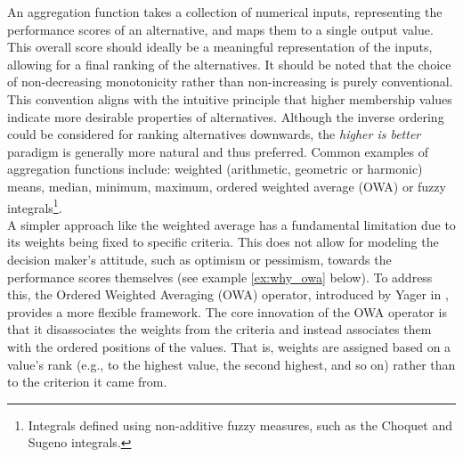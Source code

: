An aggregation function takes a collection of numerical inputs, representing the performance scores of an alternative, and maps them to a single output value. This overall score should ideally be a meaningful representation of the inputs, allowing for a final ranking of the alternatives. It should be noted that the choice of non-decreasing monotonicity rather than non-increasing is purely conventional. This convention aligns with the intuitive principle that higher membership values indicate more desirable properties of alternatives. Although the inverse ordering could be considered for ranking alternatives downwards, the \textit{higher is better} paradigm is generally more natural and thus preferred. Common examples of aggregation functions include: weighted (arithmetic, geometric or harmonic) means, median, minimum, maximum, ordered weighted average (OWA) or fuzzy integrals\footnote{Integrals defined using non-additive fuzzy measures, such as the Choquet and Sugeno integrals.}.\\

A simpler approach like the weighted average has a fundamental limitation due to its weights being fixed to specific criteria. This does not allow for modeling the decision maker's attitude, such as optimism or pessimism, towards the performance scores themselves (see example \ref{ex:why_owa} below). To address this, the Ordered Weighted Averaging (OWA) operator, introduced by Yager in \cite{YagerOWA}, provides a more flexible framework. The core innovation of the OWA operator is that it disassociates the weights from the criteria and instead associates them with the ordered positions of the values. That is, weights are assigned based on a value's rank (e.g., to the highest value, the second highest, and so on) rather than to the criterion it came from.\\

